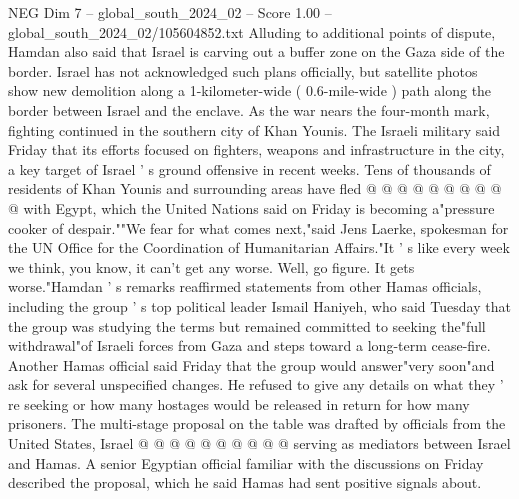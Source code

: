 \begin{textsample}{NEG Dim 7 – global\_south\_2024\_02 – Score 1.00 – global\_south\_2024\_02/105604852.txt}
Alluding to additional points of dispute, Hamdan also said that Israel is carving out a buffer zone on the Gaza side of the border.
Israel has not acknowledged such plans officially, but satellite photos show new demolition along a 1-kilometer-wide ( 0.6-mile-wide ) path along the border between Israel and the enclave.
As the war nears the four-month mark, fighting continued in the southern city of Khan Younis.
The Israeli military said Friday that its efforts focused on fighters, weapons and infrastructure in the city, a key target of Israel ' s ground offensive in recent weeks.
Tens of thousands of residents of Khan Younis and surrounding areas have fled @ @ @ @ @ @ @ @ @ @ with Egypt, which the United Nations said on Friday is becoming a"pressure cooker of despair.""We fear for what comes next,"said Jens Laerke, spokesman for the UN Office for the Coordination of Humanitarian Affairs."It ' s like every week we think, you know, it can't get any worse.
Well, go figure.
It gets worse."Hamdan ' s remarks reaffirmed statements from other Hamas officials, including the group ' s top political leader Ismail Haniyeh, who said Tuesday that the group was studying the terms but remained committed to seeking the"full withdrawal"of Israeli forces from Gaza and steps toward a long-term cease-fire.
Another Hamas official said Friday that the group would answer"very soon"and ask for several unspecified changes.
He refused to give any details on what they ' re seeking or how many hostages would be released in return for how many prisoners.
The multi-stage proposal on the table was drafted by officials from the United States, Israel @ @ @ @ @ @ @ @ @ @ serving as mediators between Israel and Hamas.
A senior Egyptian official familiar with the discussions on Friday described the proposal, which he said Hamas had sent positive signals about.

\end{textsample}
